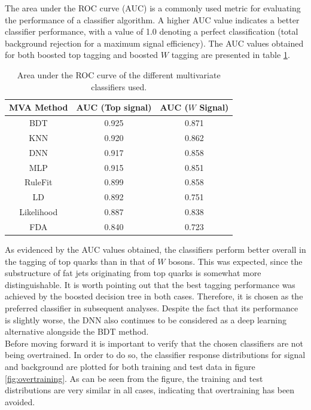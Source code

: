\documentclass[main]{subfiles} %
\begin{document}
The area under the ROC curve (AUC) is a commonly used metric for evaluating the performance of a classifier algorithm. A higher AUC value indicates a better classifier performance, with a value of 1.0 denoting a perfect classification (total background rejection for a maximum signal efficiency). The AUC values obtained for both boosted top tagging and boosted $W$ tagging are presented in table \ref{tab:AUC_values}. \\


\begin{table}[h]
\centering
\begin{tabular}{|c|c|c|}
\hline
MVA Method & AUC (Top signal) & AUC ($W$ Signal) \\ \hline
BDT        & 0.925            & 0.871          \\ \hline
KNN        & 0.920            & 0.862          \\ \hline
DNN        & 0.917            & 0.858          \\ \hline
MLP        & 0.915            & 0.851          \\ \hline
RuleFit    & 0.899            & 0.858          \\ \hline
LD         & 0.892            & 0.751          \\ \hline
Likelihood & 0.887            & 0.838          \\ \hline
FDA        & 0.840            & 0.723          \\ \hline
\end{tabular}
\caption{Area under the ROC curve of the different multivariate classifiers used.}
\label{tab:AUC_values}
\end{table}

As evidenced by the AUC values obtained, the classifiers perform better overall in the tagging of top quarks than in that of $W$ bosons. This was expected, since the substructure of fat jets originating from top quarks is somewhat more distinguishable. It is worth pointing out that the best tagging performance was achieved by the boosted decision tree in both cases. Therefore, it is chosen as the preferred classifier in subsequent analyses. Despite the fact that its performance is slightly worse, the DNN also continues to be considered as a deep learning alternative alongside the BDT method.\\ 

Before moving forward it is important to verify that the chosen classifiers are not being overtrained. In order to do so, the classifier response distributions for signal and background are plotted for both training and test data in figure \ref{fig:overtraining}. As can be seen from the figure, the training and test distributions are very similar in all cases, indicating that overtraining has been avoided. \\
\end{document}
